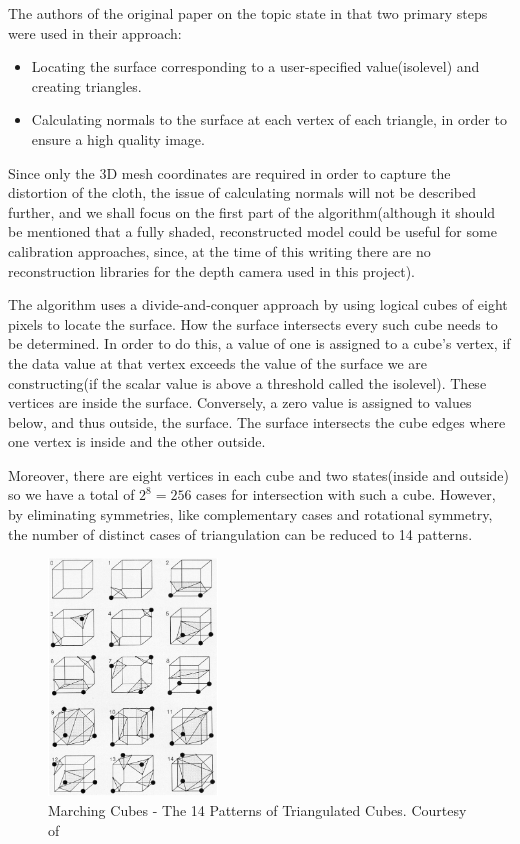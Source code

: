 \documentclass[]{article}
\begin{document}
 The authors of the original paper on the topic state in \cite{william87} that two primary steps were used in their approach:
\begin{itemize}
\item Locating the surface corresponding to a user-specified value(isolevel) and creating triangles.
\item Calculating normals to the surface at each vertex of each triangle, in order to ensure a high quality image.
\end{itemize}

Since only the 3D mesh coordinates are required in order to capture the distortion of the cloth, the issue of calculating normals will not be described further, and we shall focus on the first part of the algorithm(although it should be mentioned that a fully shaded, reconstructed model could be useful for some calibration approaches, since, at the time of this writing there are no reconstruction libraries for the depth camera used in this project).

The algorithm uses a divide-and-conquer approach by using logical cubes of eight pixels to locate the surface. How the surface intersects every such cube needs to be determined. In order to do this, a value of one is assigned to a cube's vertex, if the data value at that vertex exceeds the value of the surface we are constructing(if the scalar value is above a threshold called the isolevel). These vertices are inside the surface. Conversely, a zero value is assigned to values below, and thus outside, the surface. The surface intersects the cube edges where one vertex is inside and the other outside.

Moreover, there are eight vertices in each cube and two states(inside and outside) so we have a total of $2^{8} = 256$ cases for intersection with such a cube. However, by eliminating symmetries, like complementary cases and rotational symmetry, the number of distinct cases of triangulation can be reduced to 14 patterns.

\begin{figure}[hbtp]
    \centering
    \includegraphics[width=0.4\textwidth]{figures/MarchingCubesTriagulationCases.PNG}
    \caption{Marching Cubes - The 14 Patterns of Triangulated Cubes. Courtesy of \cite{william87}}
    \label{fig:MarchingCubesTrianglatedCubes}
\end{figure}
\end{document}
